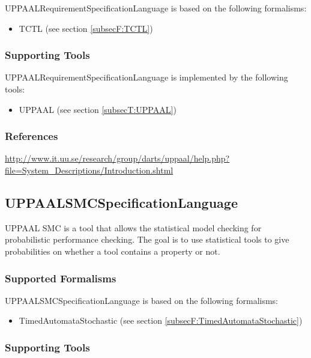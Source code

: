 UPPAALRequirementSpecificationLanguage is based on the following formalisms:
\begin{itemize}
	\item TCTL (see section \ref{subsecF:TCTL})
\end{itemize}



\subsubsection{Supporting Tools}

UPPAALRequirementSpecificationLanguage is implemented by the following tools:
\begin{itemize}
	\item UPPAAL (see section \ref{subsecT:UPPAAL})
\end{itemize}


\subsubsection{References}

\url{http://www.it.uu.se/research/group/darts/uppaal/help.php?file=System_Descriptions/Introduction.shtml}



\subsection{UPPAALSMCSpecificationLanguage}
\label{subsecL:UPPAALSMCSpecificationLanguage}


UPPAAL SMC is a tool that allows the statistical model checking for probabilistic performance checking.
The goal is to use statistical tools to give probabilities on whether a tool contains a property or not.

\subsubsection{Supported Formalisms}

UPPAALSMCSpecificationLanguage is based on the following formalisms:
\begin{itemize}
	\item TimedAutomataStochastic (see section \ref{subsecF:TimedAutomataStochastic})
\end{itemize}


\subsubsection{Supporting Tools}

